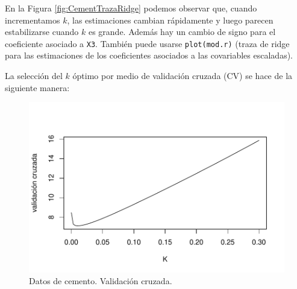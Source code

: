 \documentclass[
]{article}
\newenvironment{Shaded}{\begin{snugshade}}{\end{snugshade}}
\newcommand{\AttributeTok}[1]{\textcolor[rgb]{0.77,0.63,0.00}{#1}}
\newcommand{\FunctionTok}[1]{\textcolor[rgb]{0.00,0.00,0.00}{#1}}
\newcommand{\NormalTok}[1]{#1}
\newcommand{\OtherTok}[1]{\textcolor[rgb]{0.56,0.35,0.01}{#1}}
\newcommand{\SpecialCharTok}[1]{\textcolor[rgb]{0.00,0.00,0.00}{#1}}
\newcommand{\StringTok}[1]{\textcolor[rgb]{0.31,0.60,0.02}{#1}}
\begin{document}
En la Figura \ref{fig:CementTrazaRidge} podemos observar que, cuando incrementamos \(k\), las estimaciones cambian rápidamente y luego parecen estabilizarse cuando \(k\) es grande. Además hay un cambio de signo para el coeficiente asociado a \texttt{X3}. También puede usarse \texttt{plot(mod.r)} (traza de ridge para las estimaciones de los coeficientes asociados a las covariables escaladas).

La selección del \(k\) óptimo por medio de validación cruzada (CV) se hace de la siguiente manera:

\begin{Shaded}
\end{Shaded}

\begin{figure}

{\centering \includegraphics{MLG2_files/figure-latex/cementridge3-1} 

}

\caption{\label{fig:CementCVridge} Datos de cemento. Validación cruzada.}\label{fig:cementridge3}
\end{figure}

\begin{Shaded}
\end{Shaded}
\end{document}
